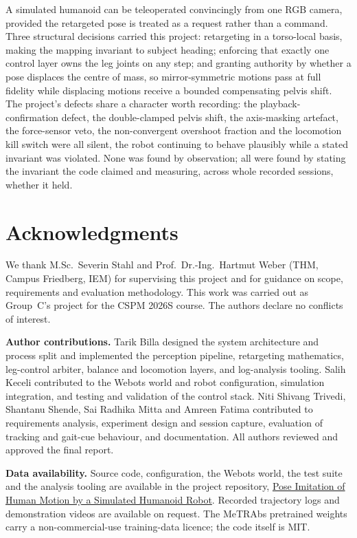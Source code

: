 \documentclass[twocolumn]{article}
\begin{document}
A simulated humanoid can be teleoperated convincingly from one RGB camera, provided the
retargeted pose is treated as a request rather than a command. Three structural decisions
carried this project: retargeting in a torso-local basis, making the mapping invariant to
subject heading; enforcing that exactly one control layer owns the leg joints on any step; and
granting authority by whether a pose displaces the centre of mass, so mirror-symmetric motions
pass at full fidelity while displacing motions receive a bounded compensating pelvis shift.
The project's defects share a character worth recording: the playback-confirmation defect, the
double-clamped pelvis shift, the axis-masking artefact, the force-sensor veto, the
non-convergent overshoot fraction and the locomotion kill switch were all silent, the robot
continuing to behave plausibly while a stated invariant was violated. None was found by
observation; all were found by stating the invariant the code claimed and measuring, across
whole recorded sessions, whether it held.

\section*{Acknowledgments}

We thank M.Sc.~Severin Stahl and Prof.~Dr.-Ing.~Hartmut Weber (THM, Campus Friedberg, IEM)
for supervising this project and for guidance on scope, requirements and evaluation
methodology. This work was carried out as Group~C's project for the CSPM 2026S course. The
authors declare no conflicts of interest.

\textbf{Author contributions.} Tarik Billa designed the system architecture and process split
and implemented the perception pipeline, retargeting mathematics, leg-control arbiter, balance
and locomotion layers, and log-analysis tooling. Salih Keceli contributed to the Webots world
and robot configuration, simulation integration, and testing and validation of the control
stack. Niti Shivang Trivedi, Shantanu Shende, Sai Radhika Mitta and Amreen Fatima contributed
to requirements analysis, experiment design and session capture, evaluation of tracking and
gait-cue behaviour, and documentation. All authors reviewed and approved the final report.

\textbf{Data availability.} Source code, configuration, the Webots world, the test suite and
the analysis tooling are available in the project repository,
\href{https://github.com/tarikbilla/Pose-Imitation-of-Human-Motion-by-a-Simulated-Humanoid-Robot}%
{Pose Imitation of Human Motion by a Simulated Humanoid Robot}.
Recorded trajectory logs and demonstration videos are available on request. The MeTRAbs
pretrained weights carry a non-commercial-use training-data licence; the code itself is MIT.

\printbibliography[title={References}]
\end{document}
